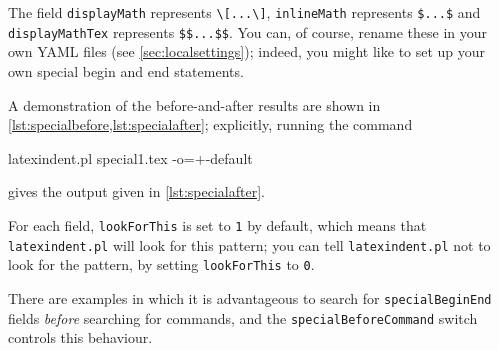  The field \texttt{displayMath} represents \lstinline!\[...\]!, \texttt{inlineMath}
 represents \lstinline!$...$! and \texttt{displayMathTex} represents \lstinline!$$...$$!.
 You can, of course, rename these in your own YAML files (see \vref{sec:localsettings});
 indeed, you might like to set up your own special begin and end statements.

 \begin{example}
 A demonstration of the before-and-after results are shown in
 \cref{lst:specialbefore,lst:specialafter}; explicitly, running the command

 \begin{commandshell}
latexindent.pl special1.tex -o=+-default
 \end{commandshell}

 gives the output given in \cref{lst:specialafter}.

 \begin{cmhtcbraster}
 \end{cmhtcbraster}
 \end{example}

 For each field, \texttt{lookForThis} is set to \texttt{1} by default, which means that
 \texttt{latexindent.pl} will look for this pattern; you can tell \texttt{latexindent.pl}
 not to look for the pattern, by setting \texttt{lookForThis} to \texttt{0}.

 There are  examples in which it is
 advantageous to search for \texttt{specialBeginEnd} fields \emph{before} searching for
 commands, and the \texttt{specialBeforeCommand} switch controls this behaviour.

